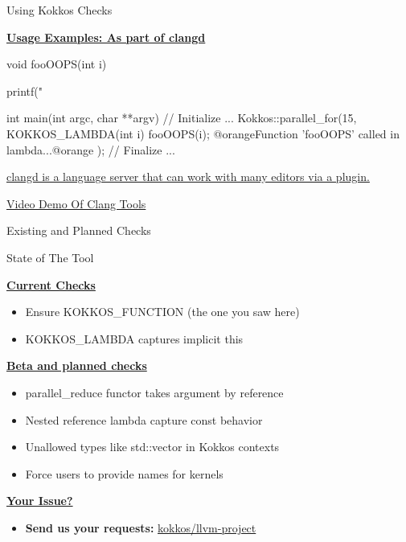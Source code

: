 \begin{frame}[fragile]{Using Kokkos Checks}
  
  \textbf{\ul{Usage Examples: As part of clangd}}
  \begin{code}[linebackgroundcolor={},
      keywords={}, frame=single
    ]
void fooOOPS(int i) { printf("%

int main(int argc, char **argv) {
  // Initialize  ...
  Kokkos::parallel_for(15, KOKKOS_LAMBDA(int i) {
       fooOOPS(i); @orangeFunction 'fooOOPS' called in lambda...@orange
      });
  }
  // Finalize ...
}
  \end{code}

  \href{https://clangd.llvm.org/}{clangd is a language server that can work with many editors via a plugin.}

  \vspace{20pt}

  \href{https://github.com/kokkos/kokkos-tutorials/blob/main/LectureSeries/KokkosTutorial_07_ClangSA.mp4}{Video Demo Of Clang Tools}

\end{frame}

\begin{frame}[fragile]{Existing and Planned Checks}
  
  {\huge State of The Tool}

  \textbf{\ul{Current Checks}}
  \begin{itemize}
    \item Ensure KOKKOS\_FUNCTION (the one you saw here)
    \item KOKKOS\_LAMBDA captures implicit this
  \end{itemize}

  \textbf{\ul{Beta and planned checks}}
  \begin{itemize}
    \item parallel\_reduce functor takes argument by reference
    \item Nested reference lambda capture const behavior
    \item Unallowed types like std::vector in Kokkos contexts
    \item Force users to provide names for kernels
  \end{itemize}

  \textbf{\ul{Your Issue?}}
  \begin{itemize}
      \item \textbf{Send us your requests:} \href{https://github.com/kokkos/llvm-project}{kokkos/llvm-project}
  \end{itemize}
\end{frame}
